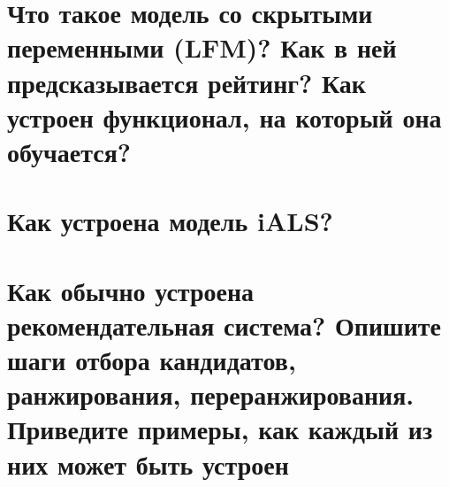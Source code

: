 \documentclass[14pt]{extarticle}
\begin{document}
	\section{Что такое модель со скрытыми переменными (LFM)? Как в ней предсказывается рейтинг? Как устроен функционал, на который она обучается?} %
	
	
	\newpage
	
	\section{Как устроена модель iALS?} 
	
	
	\newpage
	
	\section{Как обычно устроена рекомендательная система? Опишите шаги отбора кандидатов, ранжирования, переранжирования. Приведите примеры, как каждый из них может быть устроен} 
	
\end{document}
